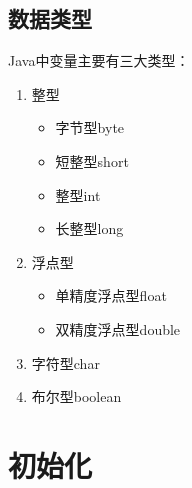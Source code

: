 \subsection{数据类型}

Java中变量主要有三大类型：

\begin{enumerate}
	\item 整型
	      \begin{itemize}
		      \item 字节型byte
		      \item 短整型short
		      \item 整型int
		      \item 长整型long
	      \end{itemize}

	\item 浮点型
	      \begin{itemize}
		      \item 单精度浮点型float
		      \item 双精度浮点型double
	      \end{itemize}

	\item 字符型char

	\item 布尔型boolean
\end{enumerate}

\begin{table}[H]
	\centering
	\caption{不同数据类型的取值范围}
\end{table}

\newpage

\section{初始化}

